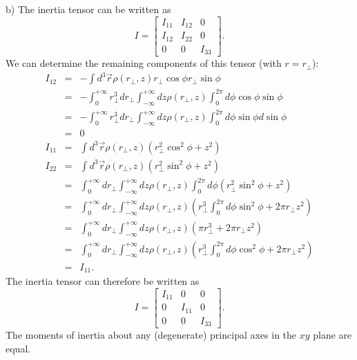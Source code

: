 \documentclass[letterpaper,11pt]{article}
\begin{document}
b) The inertia tensor can be written as
\begin{equation*}
 I = \left[ \begin{array}{ccc}
  I_{11} & I_{12} & 0 \\
  I_{12} & I_{22} & 0 \\
  0 & 0 & I_{33}
 \end{array} \right].
\end{equation*}
We can determine the remaining components of this tensor (with $r = r_\perp$):
\begin{eqnarray*}
 I_{12} & = & - \int d^3\vec{r} \rho(r_\perp,z) r_\perp \cos\phi r_\perp \sin\phi \\
 & = & - \int_0^{+\infty} r_\perp^3 dr_\perp \int_{-\infty}^{+\infty} dz \rho(r_\perp,z) \int_0^{2\pi} d\phi \cos\phi \sin\phi \\
 & = & - \int_0^{+\infty} r_\perp^3 dr_\perp \int_{-\infty}^{+\infty} dz \rho(r_\perp,z) \int_0^{2\pi} d\phi \sin\phi d \sin\phi \\
 & = & 0 \\
 I_{11} & = & \int d^3\vec{r} \rho(r_\perp,z) (r_\perp^2 \cos^2\phi + z^2) \\
 I_{22} & = & \int d^3\vec{r} \rho(r_\perp,z) (r_\perp^2 \sin^2\phi + z^2) \\
 & = & \int_0^{+\infty} dr_\perp \int_{-\infty}^{+\infty} dz \rho(r_\perp,z) \int_0^{2\pi} d\phi (r_\perp^2 \sin^2\phi + z^2) \\
 & = & \int_0^{+\infty} dr_\perp \int_{-\infty}^{+\infty} dz \rho(r_\perp,z) \left( r_\perp^3 \int_0^{2\pi} d\phi \sin^2\phi + 2 \pi r_\perp z^2 \right) \\
 & = & \int_0^{+\infty} dr_\perp \int_{-\infty}^{+\infty} dz \rho(r_\perp,z) \left( \pi r_\perp^3 + 2 \pi r_\perp z^2 \right) \\
 & = & \int_0^{+\infty} dr_\perp \int_{-\infty}^{+\infty} dz \rho(r_\perp,z) \left( r_\perp^3 \int_0^{2\pi} d\phi \cos^2\phi + 2 \pi r_\perp z^2 \right) \\
 & = & I_{11}.
\end{eqnarray*}
The inertia tensor can therefore be written as
\begin{equation*}
 I = \left[ \begin{array}{ccc}
  I_{11} & 0 & 0 \\
  0 & I_{11} & 0 \\
  0 & 0 & I_{33}
 \end{array} \right].
\end{equation*}
The moments of inertia about any (degenerate) principal axes in the $xy$ plane are equal.
\end{document}
